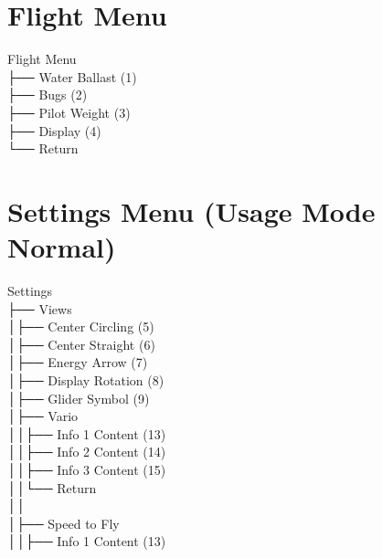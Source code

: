 \section{Flight Menu}
\menufont
Flight Menu \\
├── Water Ballast (1) \\
├── Bugs (2) \\
├── Pilot Weight (3) \\
├── Display (4) \\
└── Return \\
\sffamily

\section{Settings Menu (Usage Mode Normal)}
\menufont
Settings \\
├── Views \\
│\hspace{2em}├── Center Circling (5) \\
│\hspace{2em}├── Center Straight (6) \\
│\hspace{2em}├── Energy Arrow (7) \\
│\hspace{2em}├── Display Rotation (8) \\
│\hspace{2em}├── Glider Symbol (9) \\
│\hspace{2em}├── Vario \\
│\hspace{2em}│\hspace{2em}├── Info 1 Content (13) \\
│\hspace{2em}│\hspace{2em}├── Info 2 Content (14) \\
│\hspace{2em}│\hspace{2em}├── Info 3 Content (15) \\
│\hspace{2em}│\hspace{2em}└── Return \\
│\hspace{2em}│\hspace{2em} \\
│\hspace{2em}├── Speed to Fly \\
│\hspace{2em}│\hspace{2em}├── Info 1 Content (13) \\
